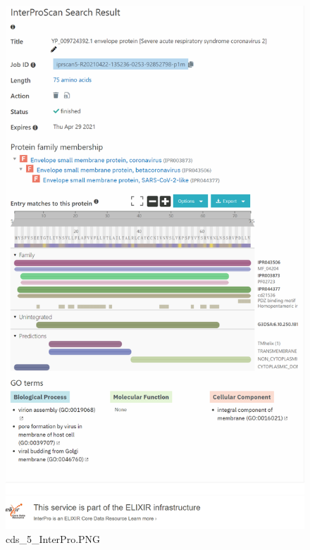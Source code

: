 \documentclass[supercite]{HustGraduPaper}
\begin{document}
	\begin{figure}[H]
		\centering
		\includegraphics[width=1\textwidth]{./material/practice2/cds_5/InterPro.png}
		\caption{cds\_5\_InterPro.PNG}
	\end{figure}
\end{document}
